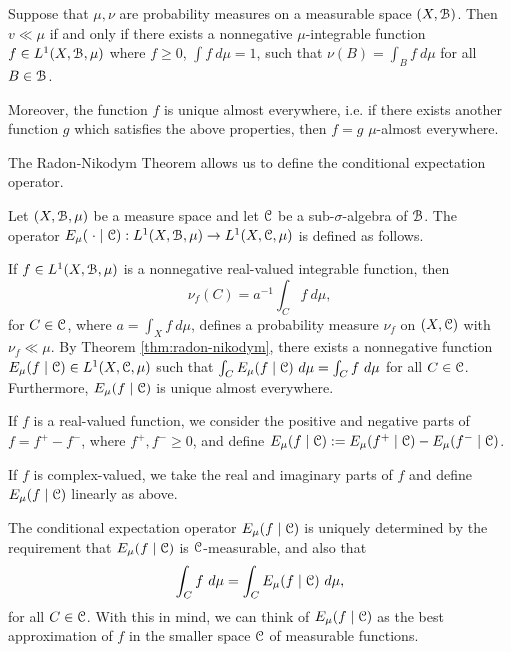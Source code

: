 \begin{theorem} \label{thm:radon-nikodym}
	Suppose that $\mu, \nu$ are probability measures on a measurable space $(X, \mathcal{B})$. Then $v \ll \mu$ if and only if there exists a nonnegative $\mu$-integrable function $f \in L^1(X, \mathcal{B}, \mu)$ where $f \geq 0$, $\int{f\ d\mu} = 1$, such that $\nu(B) = \int_B{f\ d\mu}$ for all $B \in \mathcal{B}$.
	
	Moreover, the function $f$ is unique almost everywhere, i.e. if there exists another function $g$ which satisfies the above properties, then $f = g$ $\mu$-almost everywhere.
\end{theorem}

The Radon-Nikodym Theorem allows us to define the conditional expectation operator.

\begin{definition}
	Let $(X, \mathcal{B}, \mu)$ be a measure space and let $\mathcal{C}$ be a sub-$\sigma$-algebra of $\mathcal{B}$. The  operator $E_\mu(\mathrel{}\cdot\mathrel{} \mid \mathcal{C}) : L^1(X, \mathcal{B}, \mu) \to L^1(X, \mathcal{C}, \mu)$ is defined as follows.
	
	If $f \in L^1(X, \mathcal{B}, \mu)$ is a nonnegative real-valued integrable function, then
	\[
		\nu_f(C) = a^{-1}\int_C{f\ d\mu},
	\]
	for $C \in \mathcal{C}$, where $a = \int_X{f\ d\mu}$, defines a probability measure $\nu_f$ on $(X, \mathcal{C})$ with $\nu_f \ll \mu$. By Theorem \ref{thm:radon-nikodym}, there exists a nonnegative function $E_\mu(f \mid \mathcal{C}) \in L^1(X, \mathcal{C}, \mu)$ such that $\int_C{E_\mu(f \mid \C)\ d\mu} = \int_C{f\ d\mu}$ for all $C \in \mathcal{C}$. Furthermore, $E_\mu(f \mid \mathcal{C})$ is unique almost everywhere.
	
	If $f$ is a real-valued function, we consider the positive and negative parts of $f = f^+ - f^-$, where $f^+, f^- \geq 0$, and define $E_\mu(f \mid \mathcal{C}) := E_\mu(f^+ \mid \mathcal{C}) - E_\mu(f^- \mid \mathcal{C})$.
	
	If $f$ is complex-valued, we take the real and imaginary parts of $f$ and define $E_\mu(f \mid \mathcal{C})$ linearly as above.
\end{definition}

The conditional expectation operator $E_\mu(f \mid \mathcal{C})$ is uniquely determined by the requirement that $E_\mu(f \mid \mathcal{C})$ is $\mathcal{C}$-measurable, and also that
\[
	\int_C{f\ d\mu} = \int_C{E_\mu(f \mid \C)\ d\mu},
\]
for all $C \in \mathcal{C}$. With this in mind, we can think of $E_\mu(f \mid \mathcal{C})$ as the best approximation of $f$ in the smaller space $\mathcal{C}$ of measurable functions.~\cite[Lecture 21]{ergodic-lectures}

